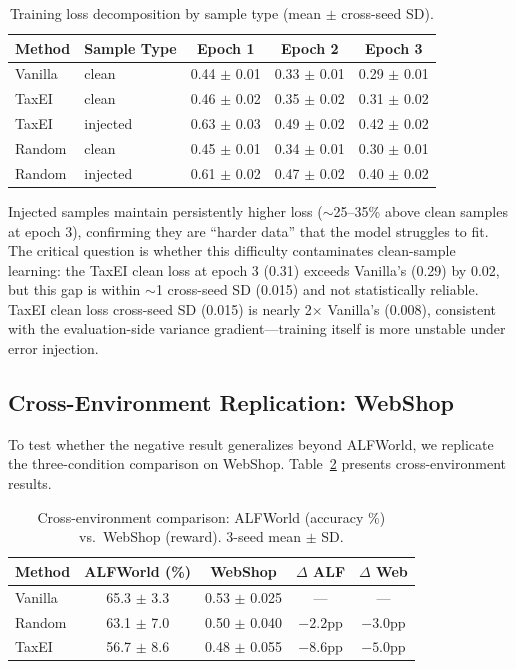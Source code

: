 \documentclass[11pt,a4paper]{article}
\begin{document}
\begin{table}[t]
\centering
\small
\caption{Training loss decomposition by sample type (mean $\pm$ cross-seed SD).}
\label{tab:training_loss}
\begin{tabular}{llccc}
\toprule
\textbf{Method} & \textbf{Sample Type} & \textbf{Epoch 1} & \textbf{Epoch 2} & \textbf{Epoch 3} \\
\midrule
Vanilla & clean & 0.44 $\pm$ 0.01 & 0.33 $\pm$ 0.01 & 0.29 $\pm$ 0.01 \\
\midrule
TaxEI & clean & 0.46 $\pm$ 0.02 & 0.35 $\pm$ 0.02 & 0.31 $\pm$ 0.02 \\
TaxEI & injected & 0.63 $\pm$ 0.03 & 0.49 $\pm$ 0.02 & 0.42 $\pm$ 0.02 \\
\midrule
Random & clean & 0.45 $\pm$ 0.01 & 0.34 $\pm$ 0.01 & 0.30 $\pm$ 0.01 \\
Random & injected & 0.61 $\pm$ 0.02 & 0.47 $\pm$ 0.02 & 0.40 $\pm$ 0.02 \\
\bottomrule
\end{tabular}
\end{table}

Injected samples maintain persistently higher loss ($\sim$25--35\% above clean samples at epoch 3), confirming they are ``harder data'' that the model struggles to fit. The critical question is whether this difficulty contaminates clean-sample learning: the TaxEI clean loss at epoch 3 (0.31) exceeds Vanilla's (0.29) by 0.02, but this gap is within $\sim$1 cross-seed SD (0.015) and not statistically reliable. TaxEI clean loss cross-seed SD (0.015) is nearly 2$\times$ Vanilla's (0.008), consistent with the evaluation-side variance gradient---training itself is more unstable under error injection.

\subsection{Cross-Environment Replication: WebShop}
\label{sec:webshop}

To test whether the negative result generalizes beyond ALFWorld, we replicate the three-condition comparison on WebShop. Table~\ref{tab:webshop} presents cross-environment results.

\begin{table}[t]
\centering
\small
\caption{Cross-environment comparison: ALFWorld (accuracy \%) vs.\ WebShop (reward). 3-seed mean $\pm$ SD.}
\label{tab:webshop}
\begin{tabular}{lcccc}
\toprule
\textbf{Method} & \textbf{ALFWorld (\%)} & \textbf{WebShop} & \textbf{$\Delta$ ALF} & \textbf{$\Delta$ Web} \\
\midrule
Vanilla & 65.3 $\pm$ 3.3 & 0.53 $\pm$ 0.025 & --- & --- \\
Random & 63.1 $\pm$ 7.0 & 0.50 $\pm$ 0.040 & $-2.2$pp & $-3.0$pp \\
TaxEI & 56.7 $\pm$ 8.6 & 0.48 $\pm$ 0.055 & $-8.6$pp & $-5.0$pp \\
\bottomrule
\end{tabular}
\end{table}
\end{document}
